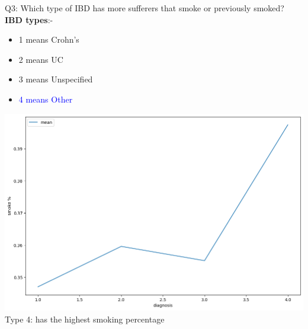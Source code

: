 \documentclass[8pt]{beamer}
\begin{document}
        \begin{frame}{Q3: Which type of IBD has more sufferers that smoke or previously smoked?}
            \textbf{IBD types}:-
            \begin{itemize}
                \item 1 means Crohn's
                \item 2 means UC
                \item 3 means Unspecified
                \item \textcolor{blue}{4 means Other}
            \end{itemize}
            \begin{center}
                \includegraphics[height=.55\textheight]{images/smoke.png}\\
                Type 4: has the highest smoking percentage
            \end{center}
        \end{frame}
\end{document}
